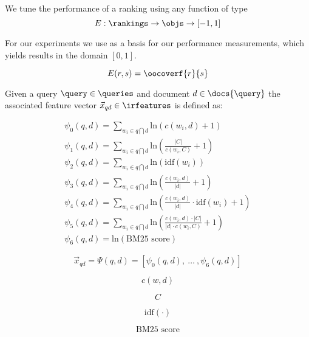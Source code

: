 \begin{definition}
  We tune the performance of a ranking using any function of type
  \[
    E :
      \rankings \rightarrow \objs \rightarrow [ -1, 1 ]
  \]

  For our experiments we use \oocover as a basis for our performance measurements,
  which yields results in the domain $[ 0, 1 ]$.

  \[
    E(r, s) = \oocoverf{r}{s}
  \]
\end{definition}

\begin{definition}
  Given a query $\query \in \queries$ and document $d \in \docs{\query}$ the
  associated feature vector ${\vec{x}}_{q d} \in \irfeatures$ is defined as:

  \[
  \begin{array}{l}
    \psi_0(q, d) = \sum_{w_i \in q \bigcap d} \text{ln}(c(w_i, d) + 1) \\
    \psi_1(q, d) = \sum_{w_i \in q \bigcap d} \text{ln}(\frac{|C|}{c(w_i, C)} + 1) \\
    \psi_2(q, d) = \sum_{w_i \in q \bigcap d} \text{ln}(\text{idf}(w_i)) \\
    \psi_3(q, d) = \sum_{w_i \in q \bigcap d} \text{ln}(\frac{c(w_i, d)}{|d|} + 1) \\
    \psi_4(q, d) = \sum_{w_i \in q \bigcap d} \text{ln}(\frac{c(w_i, d)}{|d|} \cdot \text{idf}(w_i) + 1) \\
    \psi_5(q, d) = \sum_{w_i \in q \bigcap d} \text{ln}(\frac{c(w_i, d) \cdot |C|}{|d| \cdot c(w_i, C)} + 1) \\
    \psi_6(q, d) = \text{ln}( \text{BM25 score} )
  \end{array}
  \]

  \[
    {\vec{x}}_{q d} = \Psi(q, d) = \left[ \psi_0(q, d), ~\ldots~, \psi_6(q, d) \right]
  \]
\end{definition}

\begin{definition}
  \[ c(w, d) \]
\end{definition}

\begin{definition}
  \[ C \]
\end{definition}

\begin{definition}
  \[ \text{idf}(\cdot) \]
\end{definition}

\begin{definition}
  \[ \text{BM25 score} \]
\end{definition}

